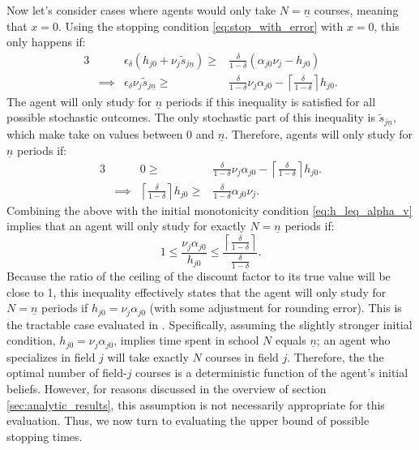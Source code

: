 \documentclass[11 pt]{article}
\newcommand{\pr}[1]{\left( #1 \right)}
\newcommand{\pass}{s}
\newcommand{\ddelta}{\left\lceil \frac{\delta}{1 - \delta} \right\rceil}
\newcommand*{\ks}[1][t]{\tilde{\pass}_{j #1}}
\begin{document}
Now let's consider cases where agents would only take $N=\underline{n}$ courses, meaning that $x = 0$.
Using the stopping condition \eqref{eq:stop_with_error} with $x=0$, this only happens if:
\begin{alignat*}{3}
    &&
    \epsilon_\delta
    \pr{h_{j0} + \nu_j \ks[\underline{n}]} 
    \geq&
    \frac{\delta}{1 - \delta} 
    (\alpha_{j0} \nu_j - h_{j0})
    \\
    &\implies&
    \epsilon_\delta
    \nu_j \ks[\underline{n}]
    \geq&
    \frac{\delta}{1 - \delta} \nu_j \alpha_{j0} - \ddelta h_{j0}.
\end{alignat*}
The agent will only study for $\underline{n}$ periods if this inequality is satisfied for all possible stochastic outcomes. 
The only stochastic part of this inequality is $\ks[\underline{n}]$, which make take on values between 0 and $\underline{n}$.
Therefore, agents will only study for $\underline{n}$ periods if:
\begin{alignat*}{3}
    &&
    0
    \geq&
    \frac{\delta}{1 - \delta} \nu_j \alpha_{j0} - \ddelta h_{j0}.
    \\
    &\implies&
    \ddelta h_{j0} 
    \geq&
    \frac{\delta}{1 - \delta} \alpha_{j0} \nu_j.
 \end{alignat*}
 Combining the above with the initial monotonicity condition \eqref{eq:h_leq_alpha_v} implies that an agent will only study for exactly $N = \underline{n}$ periods if:
\begin{equation*}
    1 
    \leq 
    \frac{\nu_j \alpha_{j0}}{h_{j0}} 
    \leq
    \frac{\ddelta}{\frac{\delta}{1 - \delta}}.
\end{equation*}
Because the ratio of the ceiling of the discount factor to its true value will be close to 1, this inequality effectively states that the agent will only study for $N = \underline{n}$ periods if $h_{j0} = \nu_j \alpha_{j0}$ (with some adjustment for rounding error). 
This is the tractable case evaluated in \textcite{AF20}.
Specifically, assuming the slightly stronger initial condition, $h_{j0} = \nu_j \alpha_{j0}$, implies time spent in school $N$ equals $\underline{n}$; an agent who specializes in field $j$ will take exactly $N$ courses in field $j$.
Therefore, the the optimal number of field-$j$ courses is a deterministic function of the agent's initial beliefs.
However, for reasons discussed in the overview of section \ref{sec:analytic_results}, this assumption is not necessarily appropriate for this evaluation. 
Thus, we now turn to evaluating the upper bound of possible stopping times. 
\end{document}
